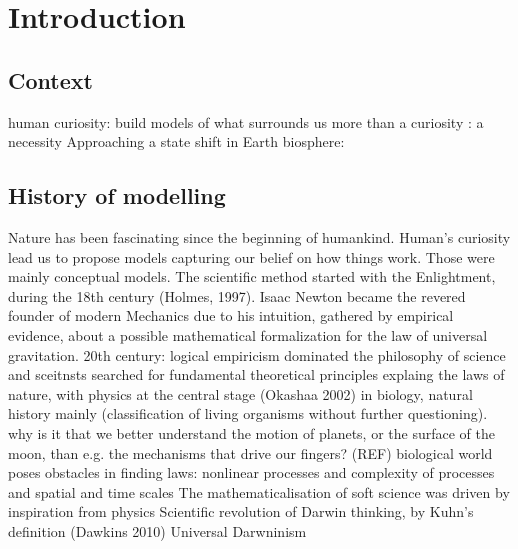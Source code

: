 %
\chapter{Introduction}
\label{sec:intro}


\section{Context}
\label{sec:intro:context}
\begin{outline}
    \1 human curiosity: build models of what surrounds us
    \1 more than a curiosity : a necessity
        \2 Approaching a state shift in Earth biosphere: \cite{Barnosky2012}
\end{outline}


\section{History of modelling}
\label{sec:intro:history}

\begin{outline}
    \1 Nature has been fascinating since the beginning of humankind.
        \2  Human's curiosity lead us to propose models capturing our belief on how things work. Those were mainly conceptual models.
    \1 The scientific method started with the Enlightment, during the 18th century (Holmes, 1997).
        \2 Isaac Newton became the revered founder of modern Mechanics due to his intuition, gathered by empirical evidence, about a possible mathematical formalization for the law of universal gravitation. \cite{Equations2021}
        \2 20th century: logical empiricism dominated the philosophy of science and sceitnsts searched for fundamental theoretical principles explaing the laws of nature, with physics at the central stage (Okashaa 2002)
        \2 in biology, natural history mainly (classification of living organisms without further questioning).
            \3 why is it that we better understand the motion of planets, or the surface of the moon, than e.g. the mechanisms that drive our fingers? (REF)
            \3 biological world poses obstacles in finding laws: nonlinear processes and complexity of processes and spatial and time scales
    \1 The mathematicalisation of soft science was driven by inspiration from physics
    \1 Scientific revolution of Darwin thinking, by Kuhn's definition (Dawkins 2010)
    \1 Universal Darwninism

\end{outline}

